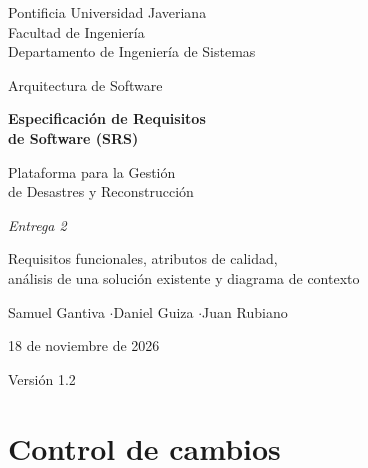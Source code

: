 \documentclass[11pt,letterpaper]{article}
\begin{document}
\begin{titlepage}
\centering
\vspace*{2.2cm}
{\large Pontificia Universidad Javeriana\\ Facultad de Ingeniería\\ Departamento de Ingeniería de Sistemas\par}
\vspace{0.4cm}
{\large Arquitectura de Software\par}
\vspace{2.2cm}
{\Huge\bfseries Especificación de Requisitos\\[3mm] de Software (SRS)\par}
\vspace{1.0cm}
{\LARGE Plataforma para la Gestión\\[2mm] de Desastres y Reconstrucción\par}
\vspace{1.6cm}
{\large\itshape Entrega 2\par}
{\large Requisitos funcionales, atributos de calidad,\\ análisis de una solución existente y diagrama de contexto\par}
\vspace{2.2cm}
{\large Samuel Gantiva \quad$\cdot$\quad Daniel Guiza \quad$\cdot$\quad Juan Rubiano\par}
\vspace{1.2cm}
{\large 18 de noviembre de 2026\par}
\vfill
{\small Versión 1.2\par}
\end{titlepage}

\section*{Control de cambios}
\end{document}
